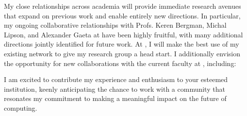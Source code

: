 My close relationships across academia will provide immediate research avenues that expand on previous work and enable entirely new directions. In particular, my ongoing collaborative relationships
with Profs. Keren Bergman, Michal Lipson, and Alexander Gaeta at \mySchoolShort{} have been highly fruitful, with many additional directions jointly identified for future work. At \appSchoolDeptShort{}, I will make the best use of my existing network to give my research group a head start. I additionally envision the opportunity for new collaborations with the current faculty at \appSchoolShort{}, including:
\begin{enumerate*}[label=(\roman*)]
    \appCollab{}
\end{enumerate*}
I am excited to contribute my experience
and enthusiasm to your esteemed institution, keenly anticipating the chance to work with a community that resonates my commitment to making a meaningful impact on the future of computing.